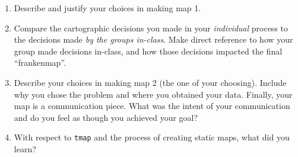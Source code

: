 \documentclass[]{article}
\begin{document}
\begin{enumerate}
\def\labelenumi{\arabic{enumi}.}
\item
  Describe and justify your choices in making map 1.
\item
  Compare the cartographic decisions you made in your \emph{individual}
  process to the decisions made \emph{by the groups in-class}. Make
  direct reference to how your group made decisions in-class, and how
  those decisions impacted the final ``frankenmap''.
\item
  Describe your choices in making map 2 (the one of your choosing).
  Include why you chose the problem and where you obtained your data.
  Finally, your map is a communication piece. What was the intent of
  your communication and do you feel as though you achieved your goal?
\item
  With respect to \texttt{tmap} and the process of creating static maps,
  what did you learn?
\end{enumerate}
\end{document}
